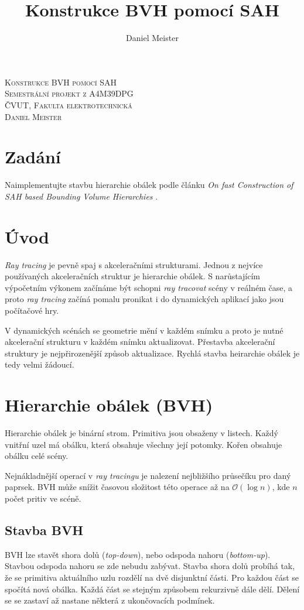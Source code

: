 \documentclass[11pt]{article}
\author{Daniel Meister}
\title{Konstrukce BVH pomocí SAH}
\begin{document}
\begin{center}
\textsc{\LARGE Konstrukce BVH pomocí SAH}\\[0.4cm]
\textsc{\Large Semestrální projekt z A4M39DPG}\\[0.4cm]
\textsc{\large ČVUT, Fakulta elektrotechnická}\\[0.4cm]
\textsc{\normalsize Daniel Meister}\\[0.5cm]
\end{center}

\section*{Zadání}
Naimplementujte stavbu hierarchie obálek podle článku \emph{On fast Construction of SAH based Bounding Volume Hierarchies} \cite{wald}.

\section{Úvod}
\emph{Ray tracing} je pevně spaj s akceleračními strukturami. Jednou z nejvíce používaných akceleračních struktur je hierarchie obálek. S narůstajícím výpočetním výkonem začínáme být schopni \emph{ray tracovat} scény v reálném čase, a proto \emph{ray tracing} začíná pomalu pronikat i do dynamických aplikací jako jsou počítačové hry.

V dynamických scénách se geometrie mění v každém snímku a proto je nutné akcelerační strukturu v každém snímku aktualizovat. Přestavba akcelerační struktury je nejpřirozenější způsob aktualizace. Rychlá stavba heirarchie obálek je tedy velmi žádoucí.

\section{Hierarchie obálek (BVH)}
Hierarchie obálek je binární strom. Primitiva jsou obsaženy v listech. Každý vnitřní uzel má obálku, která obsahuje všechny její potomky. Kořen obsahuje obálku celé scény.

Nejnákladnější operací v \emph{ray tracingu} je nalezení nejbližšího průsečíku pro daný paprsek. BVH může snížit časovou složitost této operace až na $\mathcal O(\log n)$, kde $n$ počet pritiv ve scéně.

\subsection{Stavba BVH}
BVH lze stavět shora dolů (\emph{top-down}), nebo odspoda nahoru (\emph{bottom-up}). Stavbou odspoda nahoru se zde nebudu zabývat. Stavba shora dolů probíhá tak, že se primitiva aktuálního uzlu rozdělí na dvě disjunktní části. Pro každou část se spočítá nová obálka. Každá část se stejným způsobem rekurzivně dále dělí. Dělení se se zastaví až nastane některá z ukončovacích podmínek.
\end{document}
